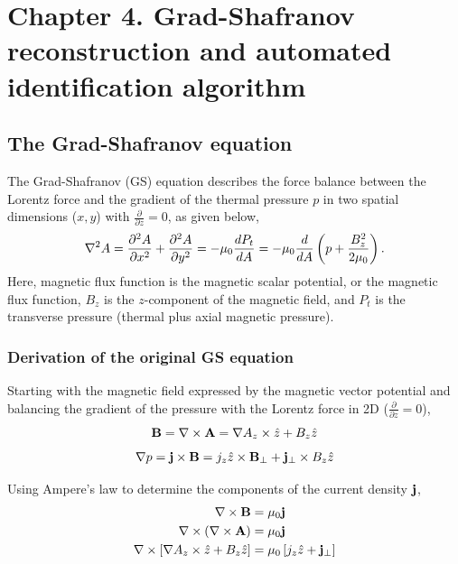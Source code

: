 \chapter{Chapter 4. Grad-Shafranov reconstruction and automated identification algorithm} \label{ch:ch4_GS} %

\section{The Grad-Shafranov equation}
%
The Grad-Shafranov (\gls{GS}) equation describes the force balance between the Lorentz force and the gradient of the thermal pressure $p$ \citep{Sonnerup:1996, Hau:1999} in two spatial dimensions ($x,y$) with $\frac{\partial}{\partial z}=0$, as given below,
\begin{equation}
    \nabla^2 A = \frac{\partial^{2} A}{\partial x^{2}} + \frac{\partial^{2} A}{\partial y^{2}} = -\mu_0 \frac{d P_t}{d A} = - \mu_0\frac{d }{d A}\left( p + \frac{B_z^2}{2\mu_0} \right).
    \label{eq:GS}
\end{equation}
Here, \gls{magnetic flux function} is the magnetic scalar potential, or the magnetic flux function, $B_z$ is the $z$-component of the magnetic field, and $P_t$ is the transverse pressure (thermal plus axial magnetic pressure).

\subsection{Derivation of the original GS equation}
Starting with the magnetic field expressed by the magnetic vector potential and balancing the gradient of the pressure with the Lorentz force in 2D ($\frac{\partial}{\partial z}=0$),
\begin{equation}
    \mathbf{B} = \nabla \times\mathbf{A} = \nabla A_z\times\hat{z} + B_z\hat{z}
    \label{eq:B}
\end{equation}
\begin{equation}
    \nabla p = \mathbf{j}\times\mathbf{B} = j_z\hat{z}\times\mathbf{B}_\perp + \mathbf{j}_\perp\times B_z\hat{z}
    \label{eq:gradp}
\end{equation}

\noindent Using Ampere's law to determine the components of the current density $\mathbf{j}$,
\begin{equation}
    \begin{split}
        \nabla \times\mathbf{B} &= \mu_0\mathbf{j} \\
        \nabla \times\left( \nabla \times\mathbf{A} \right) & = \mu_0\mathbf{j} \\
        \nabla \times\left[ \nabla A_z\times\hat{z} + B_z\hat{z} \right] &= \mu_0\left[ j_z\hat{z} + \mathbf{j}_\perp \right] \\
    \end{split}
    \label{eq:Amperes}
\end{equation}

